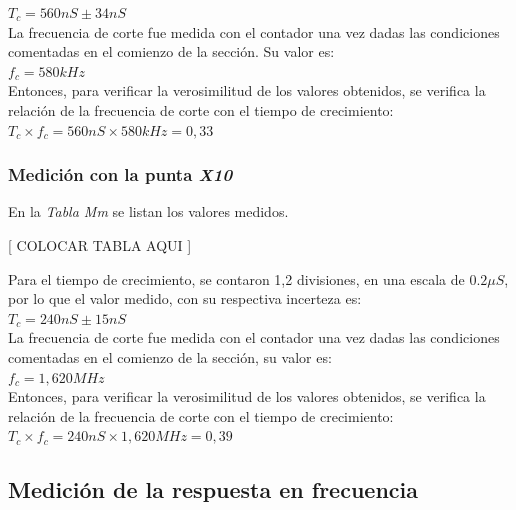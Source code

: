 \documentclass{article}
\begin{document}
$T_c = 560 nS \pm 34 nS$\\

	La frecuencia de corte fue medida con el contador una vez dadas las condiciones comentadas en el comienzo de la sección. Su valor es: \\

$f_c = 580 kHz$\\

	Entonces, para verificar la verosimilitud de los valores obtenidos, se verifica la relación de la frecuencia de corte con el tiempo de crecimiento:\\

$T_c \times f_c = 560 nS \times 580 kHz = 0,33$\\
\bigskip



\subsubsection{Medición con la punta \textit{X10}} 

En la \textit{Tabla Mm} se listan los valores medidos.
\bigskip\bigskip


	[ COLOCAR TABLA AQUI ]
	\bigskip\bigskip


	Para el tiempo de crecimiento, se contaron 1,2 divisiones, en una escala de $0.2 \mu S$, por lo que el valor medido, con su respectiva incerteza es: \\

$T_c = 240 nS \pm 15 nS$\\

	La frecuencia de corte fue medida con el contador una vez dadas las condiciones comentadas en el comienzo de la sección, su valor es:\\

$f_c = 1,620 MHz$\\

	Entonces, para verificar la verosimilitud de los valores obtenidos, se verifica la relación de la frecuencia de corte con el tiempo de crecimiento:\\

$T_c \times f_c = 240 nS \times 1,620 MHz = 0,39$\\
\bigskip



\subsection{Medición de la respuesta en frecuencia}
	
\end{document}
